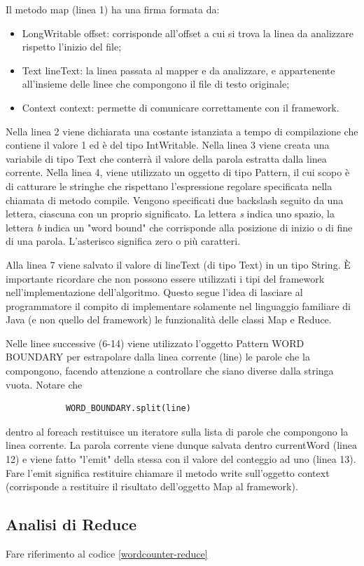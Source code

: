 \documentclass[italian,10pt,a4paper]{report}
\begin{document}
		Il metodo map (linea 1) ha una firma formata da:
		\begin{itemize}
			\item LongWritable offset: corrisponde all'offset a cui si trova la linea da analizzare rispetto l'inizio del file;
			\item Text lineText: la linea passata al mapper e da analizzare, e appartenente all'insieme delle linee che compongono il file di testo originale;
			\item Context context: permette di comunicare correttamente con il framework.
		\end{itemize}
		Nella linea 2 viene dichiarata una costante istanziata a tempo di compilazione che contiene il valore 1 ed è del tipo IntWritable.
		Nella linea 3 viene creata una variabile di tipo Text che conterrà il valore della parola estratta dalla linea corrente. Nella linea 4, viene utilizzato un oggetto di tipo Pattern, il cui scopo è di catturare le stringhe che rispettano l'espressione regolare specificata nella chiamata di metodo compile. Vengono specificati due backslash seguito da una lettera, ciascuna con un proprio significato. La lettera \textit{s} indica uno spazio, la lettera \textit{b} indica un "word bound" che corrisponde alla posizione di inizio o di fine di una parola. L'asterisco significa zero o più caratteri.
		
		Alla linea 7 viene salvato il valore di lineText (di tipo Text) in un tipo String. È importante ricordare che non possono essere utilizzati i tipi del framework nell'implementazione dell'algoritmo. Questo segue l'idea di lasciare al programmatore il compito di implementare solamente nel linguaggio familiare di Java (e non quello del framework) le funzionalità delle classi Map e Reduce.
		
		Nelle linee successive (6-14) viene utilizzato l'oggetto Pattern WORD BOUNDARY per estrapolare dalla linea corrente (line) le parole che la compongono, facendo attenzione a controllare che siano diverse dalla stringa vuota. Notare che 
		\begin{lstlisting}
			WORD_BOUNDARY.split(line)
		\end{lstlisting}
		dentro al foreach restituisce un iteratore sulla lista di parole che compongono la linea corrente.
		La parola corrente viene dunque salvata dentro currentWord (linea 12) e viene fatto "l'emit" della stessa con il valore del conteggio ad uno (linea 13).
		Fare l'emit significa restituire chiamare il metodo write sull'oggetto context (corrisponde a restituire il risultato dell'oggetto Map al framework).
		
		\subsection{Analisi di Reduce}
		
		Fare riferimento al codice \ref{wordcounter-reduce}
\end{document}
